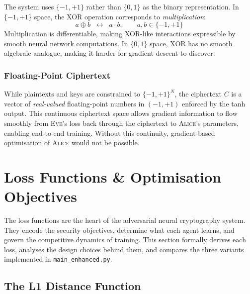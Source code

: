 \documentclass[12pt, a4paper]{article}
\newcommand{\alice}{\textsc{Alice}}
\newcommand{\eve}{\textsc{Eve}}
\newcommand{\code}[1]{\texttt{\color{CodeRed}#1}}
\begin{document}
The system uses $\{-1,+1\}$ rather than $\{0,1\}$ as the binary
representation. In $\{-1,+1\}$ space, the XOR operation corresponds to
\emph{multiplication}:
%
\begin{equation}
  a \oplus b \;\;\longleftrightarrow\;\; a \cdot b,
  \qquad a, b \in \{-1,+1\}
  \label{eq:xor_mult}
\end{equation}
%
Multiplication is differentiable, making XOR-like interactions expressible
by smooth neural network computations. In $\{0,1\}$ space, XOR has no
smooth algebraic analogue, making it harder for gradient descent to discover.

\subsubsection*{Floating-Point Ciphertext}

While plaintexts and keys are constrained to $\{-1,+1\}^N$, the ciphertext
$C$ is a vector of \emph{real-valued} floating-point numbers in $(-1,+1)$
enforced by the tanh output. This continuous ciphertext space allows
gradient information to flow smoothly from \eve{}'s loss back through
the ciphertext to \alice{}'s parameters, enabling end-to-end training.
Without this continuity, gradient-based optimisation of \alice{} would
not be possible.

\newpage
\section{Loss Functions \& Optimisation Objectives}
\label{sec:loss}

The loss functions are the heart of the adversarial neural cryptography
system. They encode the security objectives, determine what each agent
learns, and govern the competitive dynamics of training. This section
formally derives each loss, analyses the design choices behind them, and
compares the three variants implemented in \code{main\_enhanced.py}.

\subsection{The L1 Distance Function}
\label{subsec:l1}
\end{document}
